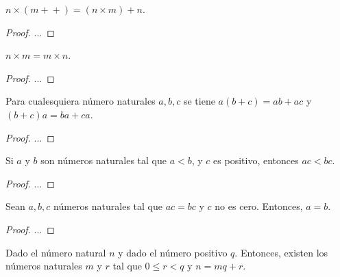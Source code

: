\begin{lemma}
  $n \times (m\!+\!\!+) = (n \times m) + n$.
\end{lemma}

\begin{proof}
  ...
\end{proof}

\begin{proposition}
  $n \times m = m \times n$.
\end{proposition}

\begin{proof}
  ...
\end{proof}

\begin{proposition}
  Para cualesquiera número naturales $a, b , c$ se tiene $a(b + c) = ab + ac$ y $(b + c)a = ba+ ca$.
\end{proposition}

\begin{proof}
  ...
\end{proof}

\begin{proposition}
  Si $a$ y $b$ son números naturales tal que $a < b$, y $c$ es positivo, entonces $ac < bc$.
\end{proposition}

\begin{proof}
  ...
\end{proof}

\begin{corollary}
  Sean $a, b, c$ números naturales tal que $ac = bc$ y $c$ no es cero. Entonces, $a = b$.
\end{corollary}

\begin{proof}
  ...
\end{proof}

\begin{proposition}
  Dado el número natural $n$ y dado el número positivo $q$. Entonces, existen los números naturales $m$ y $r$ tal que $0 \leq r < q$ y $n = mq + r$.
\end{proposition}



